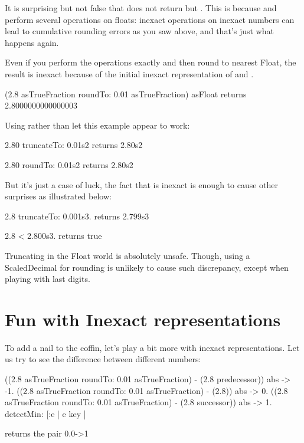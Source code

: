 \documentclass[a4paper,10pt,twoside]{book}
\begin{document}
It is surprising but not false that  does not return  but . This is because  and  perform several operations on floats: inexact operations on inexact numbers can lead to cumulative rounding errors as you saw above, and that's just what happens again.

Even if you perform the operations exactly and then round to nearest Float, the result is inexact because of the initial inexact representation of   and  . 
\begin{code}{}
(2.8 asTrueFraction roundTo: 0.01 asTrueFraction) asFloat
	returns 2.8000000000000003
\end{code}

Using  rather than   let this example appear to work:
\begin{code}{}
2.80 truncateTo: 0.01s2
	returns  2.80s2
	
2.80 roundTo: 0.01s2
	returns  2.80s2
\end{code}

But it's just a case of luck, the fact that  is inexact is enough to cause other surprises as illustrated below:
\begin{code}{}
2.8 truncateTo: 0.001s3.
	returns 2.799s3
	
2.8 < 2.800s3.
	returns true
\end{code}

Truncating in the Float world is absolutely unsafe. Though, using a ScaledDecimal for rounding is unlikely to cause such discrepancy, except when playing with last digits.



\section{Fun with Inexact representations}
To add a nail to the coffin, let's play a bit more with inexact representations. Let us try to see the difference between different numbers: 

\begin{code}{}
{
((2.8 asTrueFraction roundTo: 0.01 asTrueFraction) - (2.8 predecessor)) abs -> -1.
((2.8 asTrueFraction roundTo: 0.01 asTrueFraction) - (2.8)) abs -> 0.
((2.8 asTrueFraction roundTo: 0.01 asTrueFraction) - (2.8 successor)) abs -> 1.
} detectMin: [:e | e key ]

returns the pair
	0.0->1
\end{code}
\end{document}
